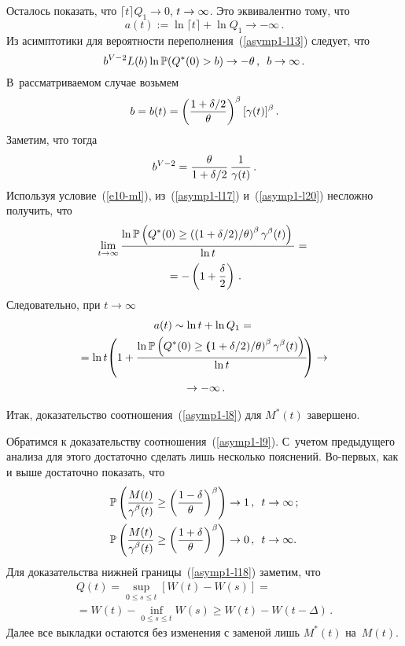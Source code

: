 \begin{multicols}{2}
Осталось показать, что $\lceil t \rceil Q_1 \to 0$, $t \hm\to \infty$. 
Это эквивалентно тому, что
$$
a(t):=\ln \lceil t \rceil + \ln Q_1 \to -\infty\,.
$$
 Из асимптотики для вероятности переполнения~(\ref{asymp1-l13}) следует, что
\begin{equation}
b^{V-2}L(b)\ln \mathbb{P}(Q^*(0)>b)\to   -\theta\,,\enskip b\to \infty\,.
\label{asymp1-l17}
\end{equation}
В~рассматриваемом случае возьмем
$$
b=b(t)=\left( \displaystyle\frac{\displaystyle 1+{\delta}/{2}\mathstrut}{\displaystyle \theta\mathstrut} \right)^\beta[\gamma(t)]^\beta\,.
$$
Заметим, что тогда
\begin{equation}
b^{V-2}=\displaystyle\frac{\displaystyle \theta\mathstrut}{\displaystyle 1+{\delta}/{2}\mathstrut}\, \displaystyle\frac{\displaystyle 1\mathstrut}{\displaystyle \gamma(t)\mathstrut}\,. 
\label{asymp1-l20}
\end{equation}
Используя условие~(\ref{e10-ml}), из~(\ref{asymp1-l17})
и~(\ref{asymp1-l20}) несложно получить, что
\begin{multline*}
\lim\limits_{t \to \infty} \displaystyle\frac{\displaystyle \ln \mathbb{P} \left( Q^*(0) \geq \left(
(1+\delta/2)/{\theta}\right)^\beta \gamma^\beta(t)
\right)\mathstrut}{\displaystyle \ln t\mathstrut}={}\\
{}=-\left(1+\displaystyle\frac{\displaystyle \delta\mathstrut}{\displaystyle 2\mathstrut}\right)\,.
\end{multline*}
Следовательно, при $t \to \infty$
\begin{multline*}
a(t) \sim \ln t + \ln Q_1={}\\
{}= \ln t\! \left( 1+\displaystyle\frac{\displaystyle \ln \mathbb{P} \left( Q^*(0) \geq \left(\!\!
(1+\delta/2)/{\theta}\right)^\beta \gamma^\beta(t) \right)\mathstrut}{\displaystyle \ln t\mathstrut}\!\!\right)\to{}\\
{}\to -\infty \,.
\end{multline*}

Итак, доказательство соотношения~(\ref{asymp1-l8}) для $M^*(t)$ завершено.

\smallskip

Обратимся к   доказательству соотношения~(\ref{asymp1-l9}). С~учетом предыдущего анализа для этого достаточно сделать лишь
несколько пояснений. Во-пер\-вых, как и выше достаточно показать,
что
\begin{align}
\mathbb{P} \left( \displaystyle\frac{\displaystyle M(t)\mathstrut}{\displaystyle \gamma^\beta(t)\mathstrut} \geq \left(
\displaystyle\frac{\displaystyle 1-\delta\mathstrut}{\displaystyle \theta\mathstrut} \right)^\beta \right ) &\to 1\,,\enskip t \to \infty \,; \label{asymp1-l18}
\\
\mathbb{P} \left( \displaystyle\frac{\displaystyle M(t)\mathstrut}{\displaystyle \gamma^\beta(t)\mathstrut} \geq \left(
\displaystyle\frac{\displaystyle 1+\delta\mathstrut}{\displaystyle \theta\mathstrut} \right)^\beta \right) &\to 0\,,\enskip t \to \infty. \label{asymp1-l19}
\end{align}
 Для доказательства нижней границы~(\ref{asymp1-l18}) заметим, что
\begin{multline*}
Q(t)=\sup\limits_{0\leq s \leq t}[W(t)-W(s)]={}\\
{}=W(t)-\inf\limits_{0\leq s \leq t} W(s)\geq
 W(t)-W(t-\Delta)\,.
\end{multline*}
Далее все выкладки остаются без изменения с заменой лишь $M^*(t)$ на~$M(t)$.


\end{multicols}
